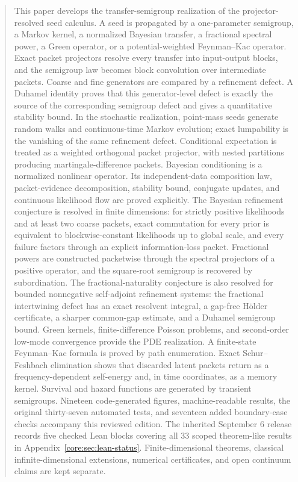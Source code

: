 \documentclass[11pt,letterpaper]{article}
\theoremstyle{plain}
\theoremstyle{plain}
\theoremstyle{plain}
\theoremstyle{definition}
\theoremstyle{definition}
\theoremstyle{definition}
\theoremstyle{definition}
\theoremstyle{definition}
\theoremstyle{remark}
\theoremstyle{remark}
\theoremstyle{remark}
\theoremstyle{remark}
\theoremstyle{remark}
\theoremstyle{remark}
\begin{document}
\begin{abstract}
This paper develops the transfer-semigroup realization of the projector-resolved seed calculus. A seed is propagated by a one-parameter semigroup, a Markov kernel, a normalized Bayesian transfer, a fractional spectral power, a Green operator, or a potential-weighted Feynman--Kac operator. Exact packet projectors resolve every transfer into input-output blocks, and the semigroup law becomes block convolution over intermediate packets. Coarse and fine generators are compared by a refinement defect. A Duhamel identity proves that this generator-level defect is exactly the source of the corresponding semigroup defect and gives a quantitative stability bound. In the stochastic realization, point-mass seeds generate random walks and continuous-time Markov evolution; exact lumpability is the vanishing of the same refinement defect. Conditional expectation is treated as a weighted orthogonal packet projector, with nested partitions producing martingale-difference packets. Bayesian conditioning is a normalized nonlinear operator. Its independent-data composition law, packet-evidence decomposition, stability bound, conjugate updates, and continuous likelihood flow are proved explicitly.  The Bayesian refinement conjecture is resolved in finite dimensions: for strictly positive likelihoods and at least two coarse packets, exact commutation for every prior is equivalent to blockwise-constant likelihoods up to global scale, and every failure factors through an explicit information-loss packet. Fractional powers are constructed packetwise through the spectral projectors of a positive operator, and the square-root semigroup is recovered by subordination. The fractional-naturality conjecture is also resolved for bounded nonnegative self-adjoint refinement systems: the fractional intertwining defect has an exact resolvent integral, a gap-free Hölder certificate, a sharper common-gap estimate, and a Duhamel semigroup bound. Green kernels, finite-difference Poisson problems, and second-order low-mode convergence provide the PDE realization. A finite-state Feynman--Kac formula is proved by path enumeration. Exact Schur--Feshbach elimination shows that discarded latent packets return as a frequency-dependent self-energy and, in time coordinates, as a memory kernel. Survival and hazard functions are generated by transient semigroups. Nineteen code-generated figures, machine-readable results, the original thirty-seven automated tests, and seventeen added boundary-case checks accompany this reviewed edition. The inherited September 6 release records five checked Lean blocks covering all 33 scoped theorem-like results in Appendix~\ref{core:sec:lean-status}. Finite-dimensional theorems, classical infinite-dimensional extensions, numerical certificates, and open continuum claims are kept separate.
\end{abstract}
\end{document}
